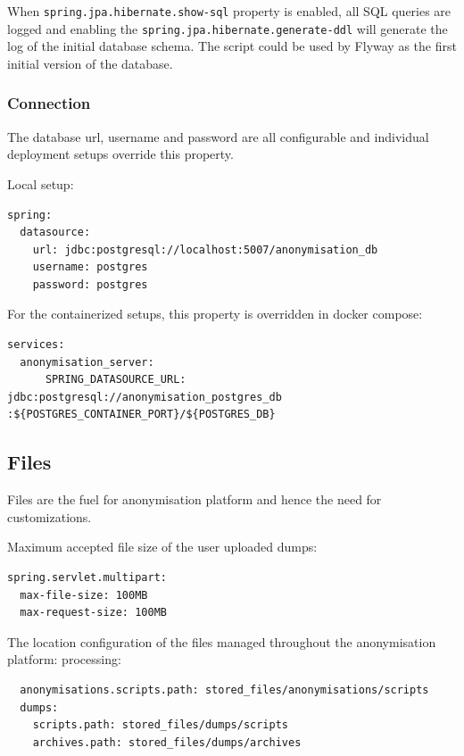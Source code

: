 \documentclass[a4paper,twoside,12pt]{book}
\begin{document}
When \verb|spring.jpa.hibernate.show-sql| property is enabled, all SQL queries are logged and enabling the \verb|spring.jpa.hibernate.generate-ddl| will generate the log of the initial database schema. The script could be used by Flyway as the first initial version of the database.

\subsubsection{Connection}

The database url, username and password are all configurable and individual deployment setups override this property.

Local setup:

\begin{verbatim}
spring:
  datasource:
    url: jdbc:postgresql://localhost:5007/anonymisation_db
    username: postgres
    password: postgres
\end{verbatim}

For the containerized setups, this property is overridden in docker compose:

\begin{verbatim}
services:
  anonymisation_server:
      SPRING_DATASOURCE_URL:  jdbc:postgresql://anonymisation_postgres_db :${POSTGRES_CONTAINER_PORT}/${POSTGRES_DB}
\end{verbatim}

\subsection{Files}

Files are the fuel for anonymisation platform and hence the need for customizations.

Maximum accepted file size of the user uploaded dumps:
\begin{verbatim}
spring.servlet.multipart:
  max-file-size: 100MB
  max-request-size: 100MB
\end{verbatim}

The location configuration of the files managed throughout the anonymisation platform:
processing:
\begin{verbatim}
  anonymisations.scripts.path: stored_files/anonymisations/scripts
  dumps:
    scripts.path: stored_files/dumps/scripts
    archives.path: stored_files/dumps/archives
\end{verbatim}
\end{document}
